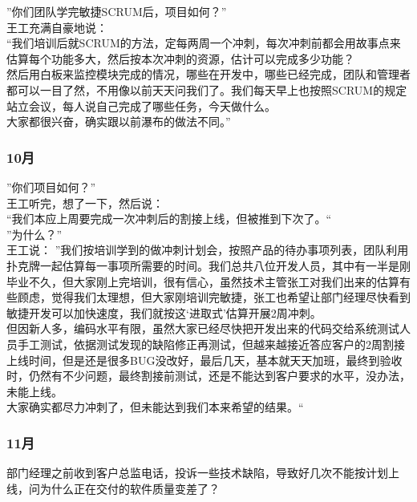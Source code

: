 \documentclass{book}        %
\begin{document}
”你们团队学完敏捷SCRUM后，项目如何？”\\
王工充满自豪地说：\\
“我们培训后就SCRUM的方法，定每两周一个冲刺，每次冲刺前都会用故事点来估算每个功能多大，然后按本次冲刺的资源，估计可以完成多少功能？\\
然后用白板来监控模块完成的情况，哪些在开发中，哪些已经完成，团队和管理者都可以一目了然，不用像以前天天问我们了。我们每天早上也按照SCRUM的规定站立会议，每人说自己完成了哪些任务，今天做什么。\\
大家都很兴奋，确实跟以前瀑布的做法不同。”\\

\hypertarget{ux6708-3}{%
\subsubsection{10月}\label{ux6708-3}}

”你们项目如何？”\\
王工听完，想了一下，然后说：\\
“我们本应上周要完成一次冲刺后的割接上线，但被推到下次了。“\\
”为什么？”\\
王工说： ”我们按培训学到的做冲刺计划会，按照产品的待办事项列表，团队利用扑克牌一起估算每一事项所需要的时间。我们总共八位开发人员，其中有一半是刚毕业不久，但大家刚上完培训，很有信心，虽然技术主管张工对我们出来的估算有些顾虑，觉得我们太理想，但大家刚培训完敏捷，张工也希望让部门经理尽快看到敏捷开发可以加快速度，我们就按这‘进取式’估算开展2周冲刺。\\
但因新人多，编码水平有限，虽然大家已经尽快把开发出来的代码交给系统测试人员手工测试，依据测试发现的缺陷修正再测试，但越来越接近答应客户的2周割接上线时间，但是还是很多BUG没改好，最后几天，基本就天天加班，最终到验收时，仍然有不少问题，最终割接前测试，还是不能达到客户要求的水平，没办法，未能上线。\\
大家确实都尽力冲刺了，但未能达到我们本来希望的结果。“ \\

\hypertarget{ux6708-4}{%
\subsubsection{11月}\label{ux6708-4}}

部门经理之前收到客户总监电话，投诉一些技术缺陷，导致好几次不能按计划上线，问为什么正在交付的软件质量变差了？\\
\end{document}
